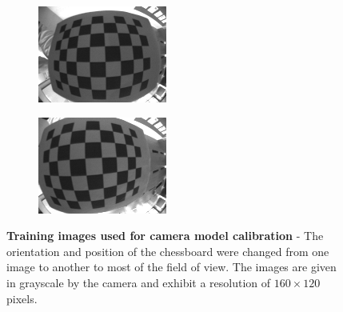 \begin{figure}[h!]
\begin{subfigure}[b]{0.2\textwidth}
    \end{subfigure}
	\begin{subfigure}[b]{0.2\textwidth}
        \centering
        \includegraphics[width=\textwidth]{images/camera/5.png}
    \end{subfigure}
	\begin{subfigure}[b]{0.2\textwidth}
        \centering
        \includegraphics[width=\textwidth]{images/camera/6.png}
    \end{subfigure}
    \caption{\textbf{Training images used for camera model calibration} - The orientation and position of the chessboard were changed from one image to another to most of the field of view. The images are given in grayscale by the camera and exhibit a resolution of $160 \times 120$ pixels.}
    \label{fig:cameraImages}
\end{figure}

